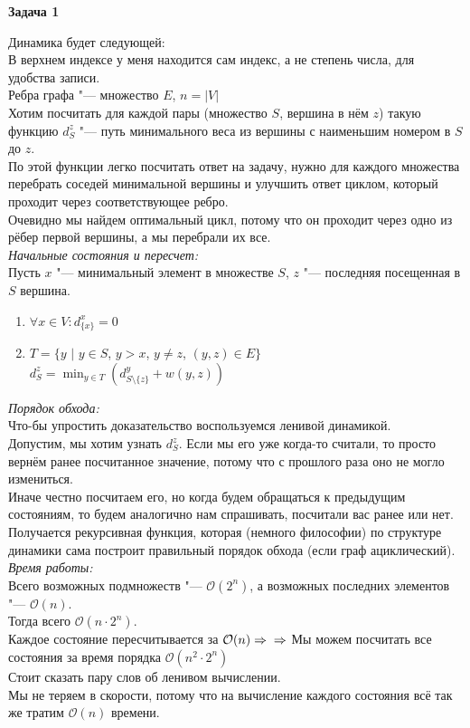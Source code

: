 \documentclass[14pt,a4paper,report]{ncc}
\begin{document}
\textbf{Задача 1}

Динамика будет следующей:\\
В верхнем индексе у меня находится сам индекс, а не степень числа, для удобства записи.\\
Ребра графа "--- множество $E$, $n = |V|$\\
Хотим посчитать для каждой пары (множество $S$, вершина в нём $z$) такую функцию $d_S^z$ "--- путь минимального веса из вершины с наименьшим номером в $S$ до $z$.\\
По этой функции легко посчитать ответ на задачу, нужно для каждого множества перебрать соседей минимальной вершины и улучшить ответ циклом, который проходит через соответствующее ребро.\\
Очевидно мы найдем оптимальный цикл, потому что он проходит через одно из рёбер первой вершины, а мы перебрали их все.\\

\textit{Начальные состояния и пересчет:}\\
Пусть $x$ "--- минимальный элемент в множестве $S$, $z$ "--- последняя посещенная в $S$ вершина.\\
\begin{enumerate}
    \item {
        $\forall x \in V: d_{\{x\}}^{x} = 0$
    }
    \item {
        $T = \{y \text{ | } y \in S$, $y > x$, $ y \neq z$, $(y, z) \in E\}$\\
        $d_{S}^{z} = \min_{y \in T}(d_{S \setminus \{z\}}^{y} + w(y, z))$\\
    }
\end{enumerate}

\textit{Порядок обхода:}\\
Что-бы упростить доказательство воспользуемся ленивой динамикой.\\
Допустим, мы хотим узнать $d_S^z$. Если мы его уже когда-то считали, то просто вернём ранее посчитанное значение, потому что с прошлого раза оно не могло измениться.\\
Иначе честно посчитаем его, но когда будем обращаться к предыдущим состояниям, то будем аналогично нам спрашивать, посчитали вас ранее или нет.\\
Получается рекурсивная функция, которая (немного философии) по структуре динамики сама построит правильный порядок обхода (если граф ациклический).\\

\textit{Время работы:}\\
Всего возможных подмножеств "--- $\mathcal{O}(2^{n})$, а возможных последних элементов "--- $\mathcal{O}(n)$.\\
Тогда всего $\mathcal{O}(n \cdot 2^n)$.\\
Каждое состояние пересчитывается за $\mathcal{O}(n) \Rightarrow \\ \Rightarrow$ Мы можем посчитать все состояния за время порядка $\mathcal{O}(n^2 \cdot 2^n)$\\
Стоит сказать пару слов об ленивом вычислении.\\
Мы не теряем в скорости, потому что на вычисление каждого состояния всё так же тратим $\mathcal{O}(n)$ времени.\\
\end{document}
